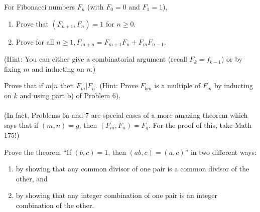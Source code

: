 \documentclass[12pt,letterpaper]{hmcpset}
\begin{document}
\begin{problem}[6]
    For Fibonacci numbers $F_n$ (with $F_0=0$ and $F_1=1$),
    \begin{enumerate}
        \item Prove that $(F_{n+1},F_n)=1$ for $n\geq0$.
        \item Prove for all $n\geq1,F_{m+n}=F_{m+1}F_n+F_mF_{n-1}.$
    \end{enumerate}
    (Hint: You can either give a combinatorial argument (recall $F_k=f_{k-1}$) or by fixing $m$ and inducting on $n$.)
\end{problem}
\begin{solution}
    \vfill
\end{solution}
\newpage

\begin{problem}[7]
    Prove that if $m|n$ then $F_m|F_n$. (Hint: Prove $F_{km}$ is a multiple of $F_m$ by inducting on $k$ and using part b) of Problem 6).\\\\
    (In fact, Problems 6a and 7 are special cases of a more amazing theorem which says that if $(m,n)=g$, then $(F_m,F_n)=F_g$. For the proof of this, take Math 175!)
\end{problem}
\begin{solution}
    \vfill
\end{solution}
\newpage

\begin{problem}[8]
    Prove the theorem ``If $(b,c)=1$, then $(ab,c)=(a,c)$'' in two different ways:
    \begin{enumerate}
        \item by showing that any common divisor of one pair is a common divisor of the other, and
        \item by showing that any integer combination of one pair is an integer combination of the other.
    \end{enumerate}
\end{problem}
\begin{solution}
    \vfill
\end{solution}
\end{document}

